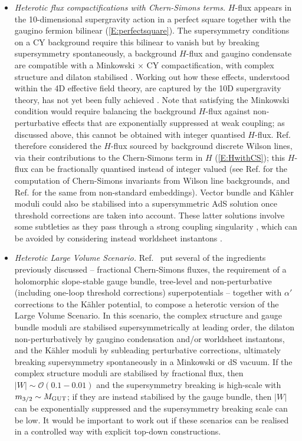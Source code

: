 \begin{itemize}
 \item \emph{Heterotic flux compactifications with Chern-Simons terms.}
$H$-flux appears in the 10-dimensional supergravity action in a perfect square together with the gaugino fermion bilinear (\ref{E:perfectsquare}).  The supersymmetry conditions on a CY background require this bilinear to vanish \cite{Dine:1986vd, LopesCardoso:2003sp, Frey:2005zz} but by breaking supersymmetry spontaneously, a background $H$-flux and gaugino condensate are compatible with a Minkowski $\times$ CY compactification, with complex structure and dilaton stabilised \cite{Rohm:1985jv}.   Working out how these effects, understood within the 4D effective field theory, are captured by the 10D supergravity theory, has not yet been fully achieved \cite{LopesCardoso:2003sp, Frey:2005zz}.  Note that satisfying the Minkowski condition would require balancing the background $H$-flux against non-perturbative effects that are exponentially suppressed at weak coupling; as discussed above, this cannot be obtained with integer quantised $H$-flux.  Ref. \cite{Gukov:2003cy} therefore considered the $H$-flux sourced by background discrete Wilson lines, via their contributions to the Chern-Simons term in $H$ (\ref{E:HwithCS}); this $H$-flux can be fractionally quantised instead of integer valued (see Ref. \cite{Apruzzi:2014dza} for the computation of Chern-Simons invariants from Wilson line backgrounds, and Ref. \cite{Anderson:2020ebu} for the same from non-standard embeddings).  Vector bundle and K\"ahler moduli could also be stabilised into a supersymmetric AdS solution once threshold corrections are taken into account.  These latter solutions involve some subtleties as they pass through a strong coupling singularity \cite{Gukov:2003cy}, which can be avoided by considering instead worldsheet instantons \cite{Curio:2005ew}.  
 
 \item \emph{Heterotic Large Volume Scenario.} Ref.~\cite{Cicoli:2013rwa} put several of the ingredients previously discussed -- fractional Chern-Simons fluxes, the requirement of a holomorphic slope-stable gauge bundle, tree-level and non-perturbative (including one-loop threshold corrections) superpotentials -- together with $\alpha'$ corrections to the K\"ahler potential, to compose a heterotic version of the Large Volume Scenario.  In this scenario, the complex structure and gauge bundle moduli are stabilised supersymmetrically at leading order, the dilaton non-perturbatively by gaugino condensation and/or worldsheet instantons, and the K\"ahler moduli by subleading perturbative corrections, ultimately breaking supersymmetry spontaneously in a Minkowski or dS vacuum.  If the complex structure moduli are stabilised by fractional flux, then $|W| \sim \mathcal{O}(0.1-0.01)$ and the supersymmetry breaking is high-scale with $m_{3/2} \sim M_{\rm GUT}$; if they are instead stabilised by the gauge bundle, then $|W|$ can be exponentially suppressed and the supersymmetry breaking scale can be low.  It would be important to work out if these scenarios can be realised in a controlled way with explicit top-down constructions.



\end{itemize}
